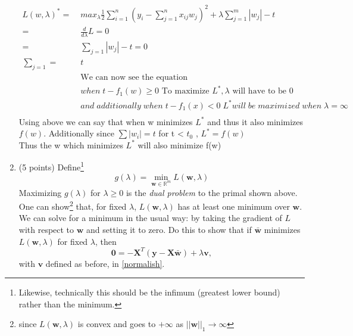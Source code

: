 \documentclass[english]{article}
\begin{document}
\begin{enumerate}
\begin{align*}
		L(w,\lambda)^* =&\; max_{\lambda} \frac{1}{2} \sum\limits_{i=1}^n \left( y_i - \sum_{j=1}^n x_{ij} w_j \right) ^2 + \lambda \sum_{j=1}^m |w_j| -t \\
		=&\; \frac{d}{d\lambda} L = 0 \\
		=&\; \sum\limits_{j=1} |w_j| - t = 0 \\
		 \sum\limits_{j=1} =&\; t \\
		&\;\text{We can now see the equation}\\
		&\;when \; t - f_1(w) \ge 0 \text{ To maximize $L^*, \lambda$ will have to be 0} \\
		&\; and \;additionally \;when \; t - f_1(x) < 0 \; L^* will \; be \; maximized \; when \; \lambda = \infty\\
\end{align*}
Using above we can say that when w minimizes $L^*$ and thus it also minimizes $f(w)$. Additionally since $\sum |w_i| = t$ for t < $t_0$ , $L^* = f(w)$\\
Thus the w which minimizes $L^*$ will also minimize f(w)\\


\item (5 points) Define\footnote{Likewise, technically this should be the infimum (greatest lower bound) rather than the minimum.}
\begin{equation}\label{dual}
\displaystyle g (\lambda) =\min_{\mathbf{w} \in \mathbb{R}^m} L(\mathbf{w}, \lambda)
\end{equation}
Maximizing $g (\lambda)$ for $\lambda \ge 0$ is the \emph{dual problem} to the primal shown above.\\
	
One can show\footnote{since $L(\mathbf{w}, \lambda)$ is convex and goes to $+\infty$ as $||\mathbf{w}||_1\to\infty$} that, for fixed $\lambda$, $L(\mathbf{w},\lambda)$ has at least one minimum over $\mathbf{w}$. We can solve for a minimum in the usual way: by taking the gradient of $L$ with respect to $\mathbf{w}$ and setting it to zero. Do this to show that if $\bar{\mathbf{w}}$ minimizes $L(\mathbf{w}, \lambda)$ for fixed $\lambda$, then
\begin{equation}\label{normalish2}
\displaystyle \mathbf{0} = -\mathbf{X}^T(\mathbf{y}-\mathbf{X}\bar{\mathbf{w}}) + \lambda \mathbf{v},
\end{equation}
with $\mathbf{v}$ defined as before, in \ref{normalish}.\\


\end{enumerate}
\end{document}
